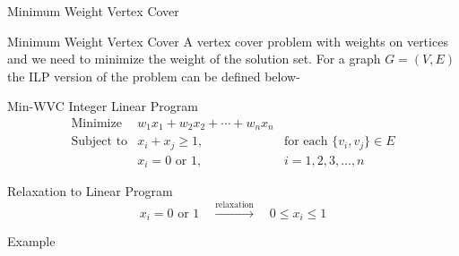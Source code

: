 \documentclass[xcolor=svgnames]{beamer}
\begin{document}
\begin{section}{Minimum Weight Vertex Cover}
    \begin{frame}{Minimum Weight Vertex Cover}
        A vertex cover problem with weights on vertices and we need to minimize the weight of the solution set. For a graph $G=(V,E)$ the ILP version of the problem can be defined below- 
        \begin{block}{Min-WVC Integer Linear Program}
            \[
                \begin{array}{lll}
                \text{Minimize} & w_1 x_1 + w_2 x_2 + \cdots + w_n x_n \\[10pt]
                \text{Subject to} & x_i + x_j \geq 1, \quad & \text{for each }\{v_i, v_j\} \in E \\[10pt]
                & x_i = 0 \text{ or } 1, \quad & i = 1, 2, 3, \dots, n
                \end{array}
            \]
        \end{block}
        \pause
        \begin{exampleblock}{Relaxation to Linear Program}
            \[
                x_i = 0 \text{ or } 1 \quad \xrightarrow{\text{relaxation}} \quad 0 \leq x_i \leq 1
            \]
        \end{exampleblock}
    \end{frame}
    \begin{frame}{Example}
        \begin{minipage}
            {0.45\textwidth}
            \centering
\end{minipage}
\end{frame}
\end{section}
\end{document}
